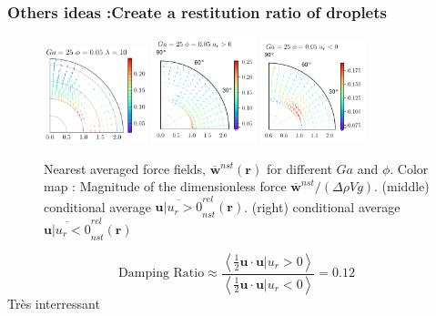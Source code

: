 \documentclass{sintefbeamer}
\newcommand{\avg}[1]{\left<#1\right>}
\newcommand{\nstavg}[1]{\overline{#1}^{nst}}
\newcommand{\nstrelavg}[1]{\overline{#1}_{nst}^{rel}}
\begin{document}
\begin{frame}
  \frametitle{Others ideas :Create a restitution ratio of droplets}
  \begin{figure}
    \centering
    \includegraphics[width=0.27\textwidth]{image/HOMOGENEOUS/fDrop/U_mu_r_0_1_Ga_25_PHI_0_05.pdf}
    \includegraphics[width=0.27\textwidth]{image/HOMOGENEOUS/fDrop/Upos_mu_r_0_1_Ga_25_PHI_0_05.pdf}
    \includegraphics[width=0.27\textwidth]{image/HOMOGENEOUS/fDrop/Uneg_mu_r_0_1_Ga_25_PHI_0_05.pdf}
    \caption{Nearest averaged force fields, $\nstavg{\textbf{w}}(\textbf{r})$ for different $Ga$ and $\phi$. 
    Color map : Magnitude of the dimensionless force  $\nstavg{\textbf{w}} / (\Delta \rho V g)$.
    (middle) conditional average  $\nstrelavg{\textbf{u}| u_r > 0}(\textbf{r})$. 
    (right) conditional average  $\nstrelavg{\textbf{u}| u_r < 0}(\textbf{r})$ }
  \end{figure}
  \begin{equation}
    \text{Damping Ratio}
    \approx \frac{\avg{\frac{1}{2} \textbf{u} \cdot \textbf{u}| u_r > 0}}
    {\avg{\frac{1}{2}\textbf{u}\cdot \textbf{u}| u_r < 0}}
    = 0.12
  \end{equation}
Très interressant

\end{frame}
\end{document}
